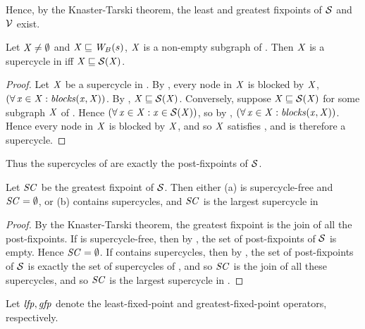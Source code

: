 Hence, by the Knaster-Tarski theorem, the least and greatest fixpoints of $\mathcal{S}$ and $\mathcal{V}$ exist.

\begin{proposition} \label{prop:supercycleGFP}
Let $\mathit{X} \ne \emptyset$ and $\mathit{X} \sqsubseteq \mathit{W}_{B}({s})$, \ie $\mathit{X}$ is a non-empty subgraph of . Then $\mathit{X}$ is a supercycle in  iff $\mathit{X} \sqsubseteq \mathcal{S}(\mathit{X})$.
\end{proposition}
%
\begin{proof}
Let $\mathit{X}$ be a supercycle in . By , every node in $\mathit{X}$ is blocked by $\mathit{X}$, \ie 
$(\forall\, \mathit{x} \in \mathit{X}: \mathit{blocks}(\mathit{x}, \mathit{X}))$. By , $\mathit{X} \sqsubseteq \mathcal{S}(\mathit{X})$.
%
Conversely, suppose $\mathit{X} \sqsubseteq \mathcal{S}(\mathit{X})$ for some subgraph $\mathit{X}$ of . Hence 
$(\forall\, \mathit{x} \in \mathit{X}: \mathit{x} \in \mathcal{S}(\mathit{X}))$, so by , $(\forall\, \mathit{x} \in \mathit{X}: \mathit{blocks}(\mathit{x}, \mathit{X}))$.
Hence every node in $\mathit{X}$ is blocked by $\mathit{X}$, and so $\mathit{X}$ satisfies , and is therefore a supercycle.
\end{proof}
%
Thus the supercycles of  are exactly the post-fixpoints of $\mathcal{S}$. %

\begin{proposition} \label{prop:GFPisLargestSC}
Let $\mathit{SC}$ be the greatest fixpoint of $\mathcal{S}$. Then either
(a)  is supercycle-free and $\mathit{SC} = \emptyset$, or 
(b)  contains supercycles, and $\mathit{SC}$ is the largest supercycle in 
\end{proposition}
%
\begin{proof}
By the Knaster-Tarski theorem, the greatest fixpoint is the join of all the post-fixpoints. 
If  is supercycle-free, then by , the set of post-fixpoints of $\mathcal{S}$ is empty. 
Hence $\mathit{SC} = \emptyset$.
If  contains supercycles, then by ,  the set of post-fixpoints of $\mathcal{S}$ is exactly the set of 
supercycles of , and so $\mathit{SC}$ is the join of all these supercycles, and so $\mathit{SC}$ is the largest supercycle in .
\end{proof}

Let $\mathit{lfp}, \mathit{gfp}$ denote the least-fixed-point and greatest-fixed-point operators, respectively.

